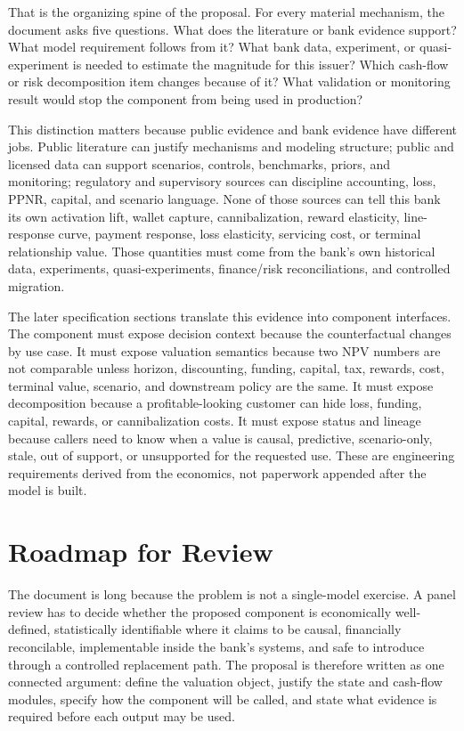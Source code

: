 \documentclass[11pt]{article}
\newcommand{\1}{\mathbf{1}}
\begin{document}
That is the organizing spine of the proposal. For every material mechanism, the
document asks five questions. What does the literature or bank evidence support?
What model requirement follows from it? What bank data, experiment, or
quasi-experiment is needed to estimate the magnitude for this issuer? Which
cash-flow or risk decomposition item changes because of it? What validation or
monitoring result would stop the component from being used in production?

This distinction matters because public evidence and bank evidence have
different jobs. Public literature can justify mechanisms and modeling
structure; public and licensed data can support scenarios, controls,
benchmarks, priors, and monitoring; regulatory and supervisory sources can
discipline accounting, loss, PPNR, capital, and scenario language. None of
those sources can tell this bank its own activation lift, wallet capture,
cannibalization, reward elasticity, line-response curve, payment response, loss
elasticity, servicing cost, or terminal relationship value. Those quantities
must come from the bank's own historical data, experiments, quasi-experiments,
finance/risk reconciliations, and controlled migration.

The later specification sections translate this evidence into component
interfaces. The component must expose decision context because the
counterfactual changes by use case. It must expose valuation semantics because
two NPV numbers are not comparable unless horizon, discounting, funding,
capital, tax, rewards, cost, terminal value, scenario, and downstream policy are
the same. It must expose decomposition because a profitable-looking customer
can hide loss, funding, capital, rewards, or cannibalization costs. It must
expose status and lineage because callers need to know when a value is causal,
predictive, scenario-only, stale, out of support, or unsupported for the
requested use. These are engineering requirements derived from the economics,
not paperwork appended after the model is built.

\section{Roadmap for Review}
\label{sec:how-to-read}

The document is long because the problem is not a single-model exercise. A
panel review has to decide whether the proposed component is economically
well-defined, statistically identifiable where it claims to be causal,
financially reconcilable, implementable inside the bank's systems, and safe to
introduce through a controlled replacement path. The proposal is therefore
written as one connected argument: define the valuation object, justify the
state and cash-flow modules, specify how the component will be called, and state
what evidence is required before each output may be used.
\end{document}
